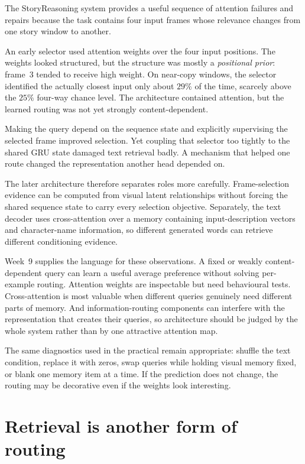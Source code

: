 \begin{architecturebox}
The StoryReasoning system provides a useful sequence of attention failures and repairs because the task contains four input frames whose relevance changes from one story window to another.

An early selector used attention weights over the four input positions. The weights looked structured, but the structure was mostly a \emph{positional prior}: frame~3 tended to receive high weight. On near-copy windows, the selector identified the actually closest input only about \(29\%\) of the time, scarcely above the \(25\%\) four-way chance level. The architecture contained attention, but the learned routing was not yet strongly content-dependent.

Making the query depend on the sequence state and explicitly supervising the selected frame improved selection. Yet coupling that selector too tightly to the shared GRU state damaged text retrieval badly. A mechanism that helped one route changed the representation another head depended on.

The later architecture therefore separates roles more carefully. Frame-selection evidence can be computed from visual latent relationships without forcing the shared sequence state to carry every selection objective. Separately, the text decoder uses cross-attention over a memory containing input-description vectors and character-name information, so different generated words can retrieve different conditioning evidence.

Week~9 supplies the language for these observations. A fixed or weakly content-dependent query can learn a useful average preference without solving per-example routing. Attention weights are inspectable but need behavioural tests. Cross-attention is most valuable when different queries genuinely need different parts of memory. And information-routing components can interfere with the representation that creates their queries, so architecture should be judged by the whole system rather than by one attractive attention map.
\end{architecturebox}

The same diagnostics used in the practical remain appropriate: shuffle the text condition, replace it with zeros, swap queries while holding visual memory fixed, or blank one memory item at a time. If the prediction does not change, the routing may be decorative even if the weights look interesting.

\section{Retrieval is another form of routing}

